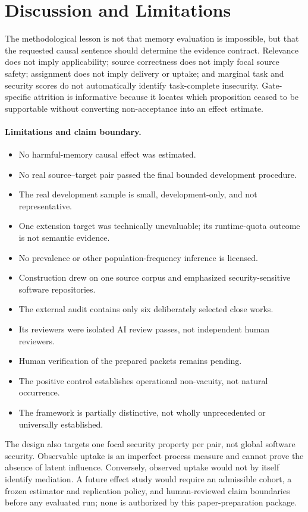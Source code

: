\section{Discussion and Limitations}
\label{sec:discussion}

The methodological lesson is not that memory evaluation is impossible, but
that the requested causal sentence should determine the evidence contract.
Relevance does not imply applicability; source correctness does not imply
focal source safety; assignment does not imply delivery or uptake; and marginal
task and security scores do not automatically identify task-complete
insecurity.  Gate-specific attrition is informative because it locates which
proposition ceased to be supportable without converting non-acceptance into an
effect estimate.

\paragraph{Limitations and claim boundary.}
\begin{itemize}[leftmargin=*,itemsep=2pt,topsep=3pt]
  \item No harmful-memory causal effect was estimated.
  \item No real source--target pair passed the final bounded development
  procedure.
  \item The real development sample is small, development-only, and not
  representative.
  \item One extension target was technically unevaluable; its runtime-quota
  outcome is not semantic evidence.
  \item No prevalence or other population-frequency inference is licensed.
  \item Construction drew on one source corpus and emphasized
  security-sensitive software repositories.
  \item The external audit contains only six deliberately selected close
  works.
  \item Its reviewers were isolated AI review passes, not independent human
  reviewers.
  \item Human verification of the prepared packets remains pending.
  \item The positive control establishes operational non-vacuity, not natural
  occurrence.
  \item The framework is partially distinctive, not wholly unprecedented or
  universally established.
\end{itemize}

The design also targets one focal security property per pair, not global
software security.  Observable uptake is an imperfect process measure and
cannot prove the absence of latent influence.  Conversely, observed uptake
would not by itself identify mediation.  A future effect study would require
an admissible cohort, a frozen estimator and replication policy, and
human-reviewed claim boundaries before any evaluated run; none is authorized
by this paper-preparation package.
